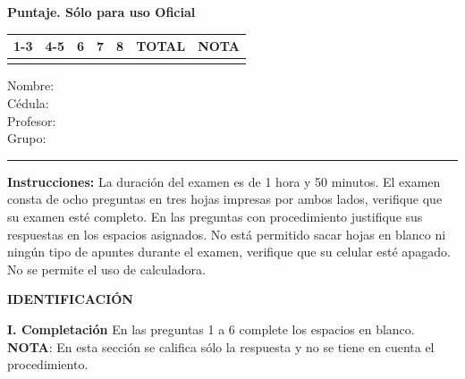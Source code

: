 \documentclass[11pt]{article}
\begin{document}
\examheader

\vspace{4pt}
\noindent
\begin{minipage}[t]{0.56\linewidth}
\textbf{Puntaje. Sólo para uso Oficial}\\[4pt]
\begin{tabular}{|c|c|c|c|c|c|c|}
\hline
1-3 & 4-5 & 6 & 7 & 8 & \textbf{TOTAL} & \textbf{NOTA} \\ \hline
 & & & & & & \\ \hline
\end{tabular}
\end{minipage}%
\hfill
\begin{minipage}[t]{0.4\linewidth}
Nombre: \dotfill\\[6pt]
Cédula: \dotfill\\[6pt]
Profesor: \dotfill\\[6pt]
Grupo: \dotfill
\end{minipage}
\vspace{6pt}\par
\noindent\rule{\linewidth}{0.4pt}

\vspace{6pt}
\noindent\textbf{Instrucciones:} La duración del examen es de 1 hora y 50 minutos. El examen consta de ocho preguntas en tres hojas impresas por ambos lados, verifique que su examen esté completo. En las preguntas con procedimiento justifique sus respuestas en los espacios asignados. No está permitido sacar hojas en blanco ni ningún tipo de apuntes durante el examen, verifique que su celular esté apagado. No se permite el uso de calculadora.

\vspace{6pt}
\noindent\textbf{IDENTIFICACIÓN}

\vspace{10pt}
\noindent\textbf{I. Completación} En las preguntas 1 a 6 complete los espacios en blanco. \textbf{NOTA}: En esta sección se califica sólo la respuesta y no se tiene en cuenta el procedimiento.
\end{document}
